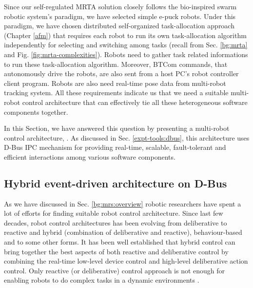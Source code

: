 Since our  self-regulated MRTA solution closely follows the bio-inspired swarm robotic system's paradigm, we have selected simple e-puck robots.  Under this paradigm, we have chosen distributed self-organized task-allocation approach\\ (Chapter \ref{afm}) that requires each robot to run its own task-allocation algorithm independently for selecting and switching among tasks (recall from Sec. \ref{bg:mrta} and Fig. \ref{fig:mrta-complexities}).  Robots need to gather task related informations to run these  task-allocation algorithm. Moreover, BTCom  commands, that autonomously drive the robots, are also sent from a host PC's robot controller client program. Robots are also need real-time pose data from multi-robot tracking system. All these requirements indicate us that we need a suitable multi-robot control architecture that can effectively tie all these heterogeneous software components together.

In this Section, we have answered this question by presenting a multi-robot control architecture, .  As discussed in Sec. \ref{expt-tools:dbus}, this architecture uses D-Bus IPC mechanism for providing real-time, scalable, fault-tolerant and efficient interactions among various software components.
\subsection{Hybrid event-driven architecture on D-Bus}
As we have discussed in Sec. \ref{bg:mrs:overview} robotic researchers have spent a lot of efforts for finding suitable robot control architecture. Since last few decades, robot control architectures has been evolving from deliberative to reactive and hybrid (combination of deliberative and reactive), behaviour-based and to some other forms. It has been well established that hybrid control can bring together the best aspects of both reactive and deliberative control by combining the real-time low-level device control and high-level deliberative action control. Only reactive (or deliberative) control approach is not enough for enabling robots to do complex tasks in a dynamic environments \cite{Gat1997}.

